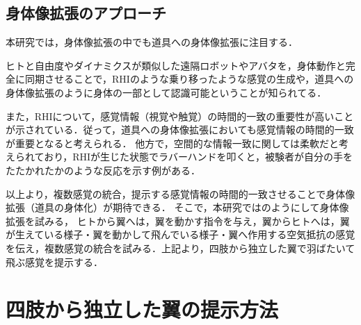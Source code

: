 \begin{small}


  \subsection{身体像拡張のアプローチ} 
    本研究では，身体像拡張の中でも道具への身体像拡張に注目する．

    ヒトと自由度やダイナミクスが類似した遠隔ロボットやアバタを，身体動作と完全に同期させることで，RHIのような乗り移ったような感覚の生成や，道具への身体像拡張のように身体の一部として認識可能ということが知られてる．

    また，RHIについて，感覚情報（視覚や触覚）の時間的一致の重要性が高いことが示されている\cite{ehrsson2007experimental}．従って，道具への身体像拡張においても感覚情報の時間的一致が重要となると考えられる．
    他方で，空間的な情報一致に関しては柔軟だと考えられており，RHIが生じた状態でラバーハンドを叩くと，被験者が自分の手をたたかれたかのような反応を示す例がある\cite{armel2003projecting}．


    以上より，複数感覚の統合，提示する感覚情報の時間的一致させることで身体像拡張（道具の身体化）が期待できる．
    そこで，本研究ではのようにして身体像拡張を試みる，
    ヒトから翼へは，翼を動かす指令を与え，翼からヒトへは，翼が生えている様子・翼を動かして飛んでいる様子・翼へ作用する空気抵抗の感覚を伝え，複数感覚の統合を試みる．上記より，四肢から独立した翼で羽ばたいて飛ぶ感覚を提示する．


\section{四肢から独立した翼の提示方法}



\end{small}
